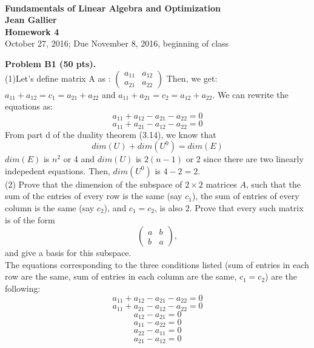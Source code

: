 \documentclass[12pt]{article}
\begin{document}
\begin{center}
\\
\vspace{1cm}
{\Large\bf Fundamentals of Linear Algebra and Optimization\\
Jean Gallier \\
\vspace{0.5cm}
Homework 4}\\[10pt]
October 27, 2016; Due November 8, 2016, beginning of class\\
\end{center}


\vspace {0.25cm}\noindent
{\bf Problem B1 (50 pts).} \\
\medskip
(1)Let's define matrix A as : $\begin{pmatrix}
a_{11} & a_{12} \\a_{21} & a_{22}
\end{pmatrix}$ Then, we get: $a_{11} + a_{12} = c_1 = a_{21} + a_{22}$ and $a_{11} + a_{21} = c_2 = a_{12} + a_{22}$. We can rewrite the equations as:
\begin{equation}
a_{11} + a_{12} - a_{21} -a_{22} = 0
\end{equation}
\begin{equation}
a_{11} + a_{21} - a_{12} - a_{22} = 0
\end{equation}
From part d of the duality theorem (3.14), we know that $$dim(U) + dim(U^0) = dim(E)$$
$dim(E)$ is $n^2$ or 4 and $dim(U)$ is $2(n-1)$ or 2 since there are two linearly indepedent equations. Then, $dim(U^0)$ is $4 - 2 = 2$.  \\
\medskip
(2)
Prove that the dimension of the subspace of $2\times 2$ matrices
$A$, such that the sum of the entries of every row is the same (say $c_1$),
the sum of entries of every column is the same (say $c_2$), and $c_1 =
c_2$, is also  $2$.
Prove that every such matrix is of the form
\[
\begin{pmatrix}
a & b  \\
b & a 
\end{pmatrix},
\]
and give a basis for this subspace.\\
The equations corresponding to the three conditions listed (sum of entries in each row are the same, sum of entries in each column are the same, $c_1 = c_2$) are the following:
\begin{equation}
a_{11} + a_{12} - a_{21} - a_{22} = 0
\end{equation}
\begin{equation}
a_{11} + a_{21} - a_{12} - a_{22} = 0
\end{equation}
\begin{equation}
a_{12} - a_{21}  = 0
\end{equation}
\begin{equation}
a_{11} - a_{22} = 0
\end{equation}
\begin{equation}
a_{22} - a_{11} = 0
\end{equation}
\begin{equation}
a_{21} - a_{12} = 0
\end{equation}
\end{document}

